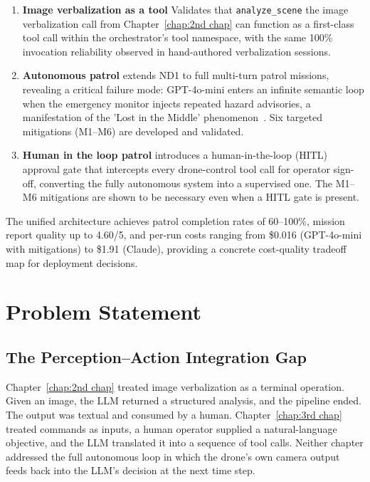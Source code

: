 \begin{enumerate}
  \item \textbf{Image verbalization as a tool} Validates that \texttt{analyze\_scene}  the image verbalization call from Chapter~\ref{chap:2nd chap} can function as a first-class tool call within the orchestrator's tool namespace, with the same 100\% invocation reliability observed in hand-authored verbalization sessions.

  \item \textbf{Autonomous patrol} extends ND1 to full multi-turn patrol missions, revealing a critical failure mode: GPT-4o-mini enters an infinite semantic loop when the emergency monitor injects repeated hazard advisories, a manifestation of the 'Lost in the Middle' phenomenon~\cite{liu2023lostinthemiddle}.  
  Six targeted mitigations (M1--M6) are developed and validated.

  \item \textbf{Human in the loop patrol} introduces a human-in-the-loop (HITL) approval gate that intercepts every drone-control tool call for operator sign-off, converting the fully autonomous system into a supervised one.  
  The M1--M6 mitigations are shown to be necessary even when a HITL gate is present.
\end{enumerate}

The unified architecture achieves patrol completion rates of 60--100\%, mission report quality up to 4.60/5, and per-run costs ranging from \$0.016 (GPT-4o-mini with mitigations) to \$1.91 (Claude), providing a concrete cost-quality tradeoff map for deployment decisions.

\section{Problem Statement}
\label{sec:ch4_problem}

\subsection{The Perception--Action Integration Gap}
\label{sec:ch4_problem_gap}

Chapter~\ref{chap:2nd chap} treated image verbalization as a terminal operation.
Given an image, the LLM returned a structured analysis, and the pipeline ended.  
The output was textual and consumed by a human.  Chapter~\ref{chap:3rd chap} treated commands as
inputs, a human operator supplied a natural-language objective, and the LLM translated it into a sequence of tool calls. 
Neither chapter addressed the full autonomous loop in
which the drone's own camera output feeds back into the LLM's decision at the next time step.

